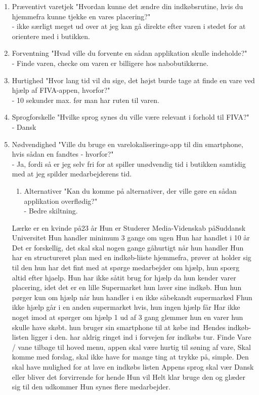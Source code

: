 \begin{enumerate}
\begin{enumerate}
\begin{enumerate}
\item Præventivt varetjek "Hvordan kunne det ændre din indkøbsrutine, hvis du hjemmefra kunne tjekke en vares placering?"\\
  - ikke særligt meget ud over at jeg kan gå direkte efter varen i stedet for at orientere med i butikken.
\item Forventning "Hvad ville du forvente en sådan applikation skulle indeholde?"\\
  - Finde varen, checke om varen er billigere hos nabobutikkerne. 
\item Hurtighed	"Hvor lang tid vil du sige, det højst burde tage at finde en vare ved hjælp af FIVA-appen, hvorfor?"\\
  - 10 sekunder max. før man har ruten til varen.
\item Sprogforskelle "Hvilke sprog synes du ville være relevant i forhold til FIVA?"\\
  - Dansk
\item Nødvendighed "Ville du bruge en varelokaliserings-app til din smartphone, hvis sådan en fandtes - hvorfor?"\\
  - Ja, fordi så er jeg selv fri for at spiller unødvendig tid i butikken samtidig med at jeg spilder medarbejderens tid.
\begin{enumerate}
\item Alternativer "Kan du komme på alternativer, der ville gøre en sådan applikation overflødig?"\\
  - Bedre skiltning.
\end{enumerate}

L\ae rke er en kvinde p\aa 23 \aa r 
Hun er Studerer Media-Videnskab p\aa Suddansk Universitet
Hun handler minimum 3 gange om ugen 
Hun har handlet i 10 \aa r
Det er forskellig, det skal skal nogen gange g\aa hurtigt n\aa r hun handler
Hun har en structureret plan med en indk\o b-liiste hjemmefra, pr\o ver at holder sig til den 
hun har det fint med at sp\o rge medarbejder om hj\ae lp, hun sp\oe rg altid efter hjaelp. 
Hun har ikke s\aa tit brug for hj\ae lp da hun kender varer placering, idet det er en lille Supermarket hun laver sine indk\o b.
Hun hun p\o rger kun om hj\ae lp n\aa r hun handler i en ikke s\aa  bekandt supermarked
F\aar hun ikke hj\ae lp g\aa r i en anden supermarket hvis, hun ingen hj\ae lp f\aa r
Har ikke noget imod at sp\o rger om hj\ae lp
1 ud af 3 gang glemmer hun en varer hun skulle have sk\o bt.
hun bruger sin smartphone til at k\o be ind\ Hendes indk\o b-listen ligger i den. 
har aldrig ringet ind i forvejen f\o r indk\o bs tur.
Finde Vare / vane tilbage til hoved menu, appen skal v\ae re hurtig til s\o ning af vare, Skal komme med forslag, skal ikke have for mange
ting at trykke p\aa, simple. Den skal have mulighed for at lave en indk\o bs listen
Appens sprog skal v\ae r Dansk eller bliver det forvirrende for hende
Hun vil Helt klar bruge den og gl\ae der sig til den udkommer
Hun synes flere medarbejder.


\end{enumerate}
\end{enumerate}
\end{enumerate}
